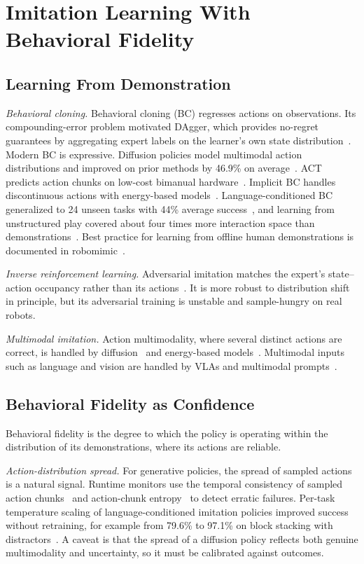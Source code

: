 \documentclass[journal]{IEEEtran}
\begin{document}
\section{Imitation Learning With Behavioral Fidelity}\label{sec:il}

\subsection{Learning From Demonstration}\label{sec:lfd}
\textit{Behavioral cloning.} Behavioral cloning (BC) regresses actions on observations. Its compounding-error problem motivated DAgger, which provides no-regret guarantees by aggregating expert labels on the learner's own state distribution~\cite{Ross2011}. Modern BC is expressive. Diffusion policies model multimodal action distributions and improved on prior methods by 46.9\% on average~\cite{Chi2023}. ACT predicts action chunks on low-cost bimanual hardware~\cite{Zhao2023}. Implicit BC handles discontinuous actions with energy-based models~\cite{Florence2021}. Language-conditioned BC generalized to 24 unseen tasks with 44\% average success~\cite{Jang2021}, and learning from unstructured play covered about four times more interaction space than demonstrations~\cite{Lynch2019}. Best practice for learning from offline human demonstrations is documented in robomimic~\cite{Mandlekar2021}.

\textit{Inverse reinforcement learning.} Adversarial imitation matches the expert's state--action occupancy rather than its actions~\cite{Ho2016}. It is more robust to distribution shift in principle, but its adversarial training is unstable and sample-hungry on real robots.

\textit{Multimodal imitation.} Action multimodality, where several distinct actions are correct, is handled by diffusion~\cite{Chi2023} and energy-based models~\cite{Florence2021}. Multimodal inputs such as language and vision are handled by VLAs and multimodal prompts~\cite{Jiang2023}.


\subsection{Behavioral Fidelity as Confidence}\label{sec:fidelity}
Behavioral fidelity is the degree to which the policy is operating within the distribution of its demonstrations, where its actions are reliable.

\textit{Action-distribution spread.} For generative policies, the spread of sampled actions is a natural signal. Runtime monitors use the temporal consistency of sampled action chunks~\cite{Agia2024} and action-chunk entropy~\cite{Romer2025} to detect erratic failures. Per-task temperature scaling of language-conditioned imitation policies improved success without retraining, for example from 79.6\% to 97.1\% on block stacking with distractors~\cite{Wu2024}. A caveat is that the spread of a diffusion policy reflects both genuine multimodality and uncertainty, so it must be calibrated against outcomes.
\end{document}
